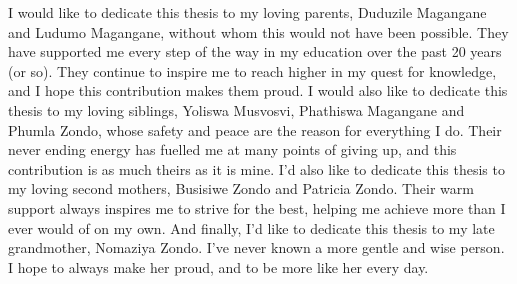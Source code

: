 
\begin{dedication} 

I would like to dedicate this thesis to my loving parents, Duduzile Magangane and Ludumo Magangane, without whom this would not have been possible. They have supported me every step of the way in my education over the past 20 years (or so). They continue to inspire me to reach higher in my quest for knowledge, and I hope this contribution makes them proud. \newline
I would also like to dedicate this thesis to my loving siblings, Yoliswa Musvosvi, Phathiswa Magangane and Phumla Zondo, whose safety and peace are the reason for everything I do. Their never ending energy has fuelled me at many points of giving up, and this contribution is as much theirs as it is mine. I'd also like to dedicate this thesis to my loving second mothers, Busisiwe Zondo and Patricia Zondo. Their warm support always inspires me to strive for the best, helping me achieve more than I ever would of on my own. And finally, I'd like to dedicate this thesis to my late grandmother, Nomaziya Zondo. I've never known a more gentle and wise person. I hope to always make her proud, and to be more like her every day. 
 
\end{dedication}